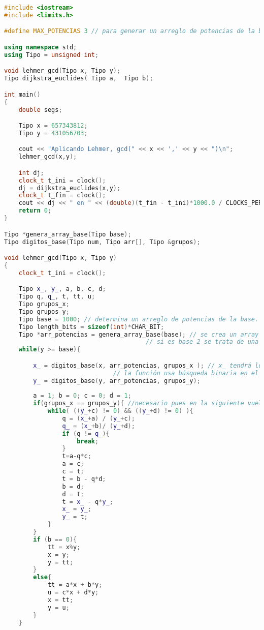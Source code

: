 \begin{lstlisting}[language=C++]
#include <iostream>
#include <limits.h>

#define MAX_POTENCIAS 3 // para generar un arreglo de potencias de la base

using namespace std;
using Tipo = unsigned int;

void lehmer_gcd(Tipo x, Tipo y);
Tipo dijkstra_euclides( Tipo a,  Tipo b);

int main()
{
    double segs;

    Tipo x = 657343812;
    Tipo y = 431056703;

    cout << "Aplicando Lehmer, gcd(" << x << ',' << y << ")\n";
    lehmer_gcd(x,y);

    int dj;
    clock_t t_ini = clock();
    dj = dijkstra_euclides(x,y);
    clock_t t_fin = clock();
    cout << dj << " en " << (double)(t_fin - t_ini)*1000.0 / CLOCKS_PER_SEC;
    return 0;
}

Tipo *genera_array_base(Tipo base);
Tipo digitos_base(Tipo num, Tipo arr[], Tipo &grupos);

void lehmer_gcd(Tipo x, Tipo y)
{
    clock_t t_ini = clock();

    Tipo x_, y_, a, b, c, d;
    Tipo q, q_, t, tt, u;
    Tipo grupos_x;
    Tipo grupos_y;
    Tipo base = 1000; // determina un arreglo de potencias de la base.
    Tipo length_bits = sizeof(int)*CHAR_BIT;
    Tipo *arr_potencias = genera_array_base(base); // se crea un array con las potencias de la base.
                                       // si es base 2 se trata de una forma especial (moviendo bits)
    while(y >= base){

        x_ = digitos_base(x, arr_potencias, grupos_x ); // x_ tendrá los dígitos más significativos que unidos serán <= a la base.
                              // la función usa búsqueda binaria en el array de potencias  de la base
        y_ = digitos_base(y, arr_potencias, grupos_y);
	
        a = 1; b = 0; c = 0; d = 1;
        if(grupos_x == grupos_y){ //necesario pues en la siguiente vuelta hay que asegurar que x e y tengan la misma cantidad d cifras
            while( ((y_+c) != 0) && ((y_+d) != 0) ){
                q = (x_+a) / (y_+c);
                q_ = (x_+b)/ (y_+d);
                if (q != q_){
                    break;
                }
                t=a-q*c;
                a = c;
                c = t;
                t = b - q*d;
                b = d;
                d = t;
                t = x_ - q*y_;
                x_ = y_;
                y_ = t;
            }
        }
        if (b == 0){
            tt = x%y;
            x = y;
            y = tt;
        }
        else{
            tt = a*x + b*y;
            u = c*x + d*y;
            x = tt;
            y = u;
        }
    }


\end{lstlisting}
